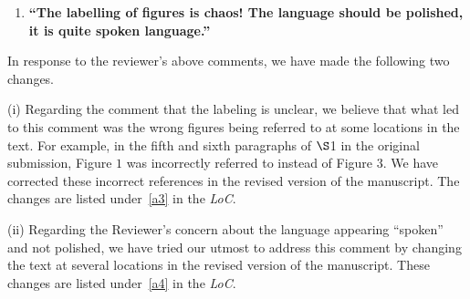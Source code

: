 \documentclass[11pt,letterpaper]{report}
\begin{document}
\begin{enumerate}[label=\textit{1.\arabic*},wide, labelwidth=!, labelindent=0pt]
\begin{enumerate}[label=\textit{2.\arabic*},wide, labelindent=0pt]


\newpage
\item \label{r2c2}{\bf ``The labelling of figures is chaos! The language should be polished, it is quite spoken language.''}
\end{enumerate}

In response to the reviewer's above comments, we have made the following two changes.

(i) Regarding the comment that the labeling is unclear, we believe that what led to this comment was the wrong figures being referred to at some locations in the text. For example, in the fifth and sixth paragraphs of $\S$1 in the original submission, Figure $1$ was incorrectly referred to instead of Figure $3$. We have corrected these incorrect references in the revised version of the manuscript. The changes are listed under~\ref{a3} in the \textit{LoC}.

(ii) Regarding the Reviewer's concern about the language appearing ``spoken'' and not polished, we have tried our utmost to address this comment by changing the text at several locations in the revised version of the manuscript. These changes are listed under~\ref{a4} in the \textit{LoC}.


\end{enumerate}

\clearpage



\end{document}
